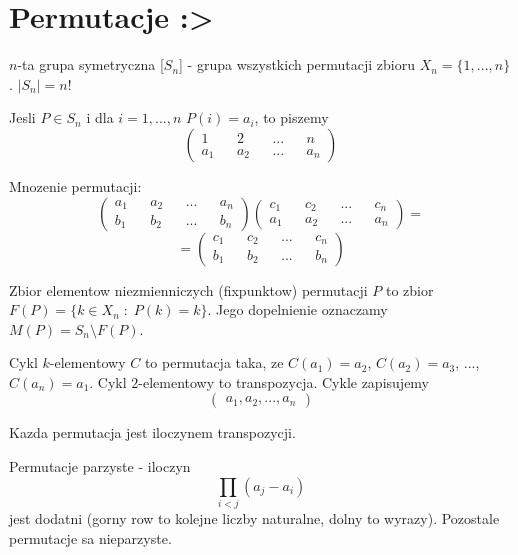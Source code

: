 \section{Permutacje :>}
\begin{multicols}{2}
    
    {\color{def}$n$-ta grupa symetryczna} [$S_n$] - grupa wszystkich permutacji zbioru $X_n = \{1, ..., n\}$. $|S_n|=n!$\medskip

    Jesli $P\in S_n$ i dla $i=1,...,n$ $P(i)=a_i$, to piszemy
    $$
        \begin{pmatrix}
            1   && 2   && ... && n  \\
            a_1 && a_2 && ... && a_n
        \end{pmatrix}
    $$

    Mnozenie permutacji:
    $$
        \begin{pmatrix}
            a_1 && a_2 && ... && a_n \\
            b_1 && b_2 && ... && b_n
        \end{pmatrix}
        \begin{pmatrix}
            c_1 && c_2 && ... && c_n \\
            a_1 && a_2 && ... && a_n
        \end{pmatrix} =
    $$
    $$=
    \begin{pmatrix}
        c_1 && c_2 && ... && c_n \\
        b_1 && b_2 && ... && b_n
    \end{pmatrix}
    $$

    {\color{def}Zbior elementow niezmienniczych} (fixpunktow) permutacji $P$ to zbior $F(P)=\{k\in X_n\;:\;P(k)=k\}$. Jego dopelnienie oznaczamy $M(P)=S_n\setminus F(P)$.\medskip

    \medskip

    {\color{def}Cykl $k$-elementowy} $C$ to permutacja taka, ze $C(a_1)=a_2$, $C(a_2)=a_3$, ..., $C(a_n)=a_1$. Cykl $2$-elementowy to {\color{acc}transpozycja}. Cykle zapisujemy
    $$\begin{pmatrix}a_1, a_2,..., a_n\end{pmatrix}$$

    Kazda permutacja jest iloczynem transpozycji.\medskip

    \medskip

    {\color{def}Permutacje parzyste} - iloczyn 
    $$\prod _{i<j}(a_j-a_i)$$ 
    jest dodatni (gorny row to kolejne liczby naturalne, dolny to wyrazy). Pozostale permutacje sa {\color{def}nieparzyste}.\medskip


\end{multicols}
